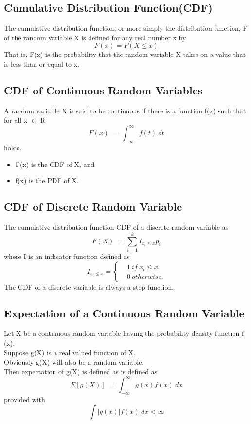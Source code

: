 \subsection*{Cumulative Distribution Function(CDF)}
The cumulative distribution function, or more simply the distribution
function, F of the random variable X is defined for any real number x
by
\[F(x) = P(X \leq x)\]
That is, F(x) is the probability that the random variable X takes on a
value that is less than or equal to x.

\subsection*{CDF of Continuous Random Variables}
A random variable X is said to be continuous if there is a function
f(x) such that for all x $\in$ R
\[ F(x)\ =\ \int_{-\infty}^{\infty}f(t)\ dt \]
holds.
\begin{itemize}
    \item F(x) is the CDF of X, and
    \item f(x) is the PDF of X.
\end{itemize}

\subsection*{CDF of Discrete Random Variable}
The cumulative distribution function CDF of a discrete random
variable as
\[ F(X)\ =\ \sum_{i=1}^{k} I_{x_i \leq x}p_i \]
where I is an indicator function defined as
\begin{equation}
I_{x_i \leq x} = 
\begin{cases}
&1\ if\ x_i \leq x\\
&0\ otherwise.
\end{cases}
\end{equation}
The CDF of a discrete variable is always a step function.



\subsection*{Expectation of a Continuous Random Variable}
Let X be a continuous random variable having the probability
density function f (x).\\
Suppose g(X) is a real valued function of X.\\
Obviously g(X) will also be a random variable.\\
Then expectation of g(X) is defined as is defined as
\[ E[g(X)]\ =\ \int_{-\infty}^{\infty} g(x)f(x)\ dx \]
provided with \[ \int |g(x)|f(x)\ dx < \infty \]

